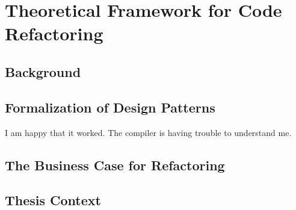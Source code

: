 \chapter{Theoretical Framework for Code Refactoring}

\section{Background}
\section{Formalization of Design Patterns}
I am happy that it worked.
The compiler is having trouble to understand me.
\section{The Business Case for Refactoring}
\section{Thesis Context}
